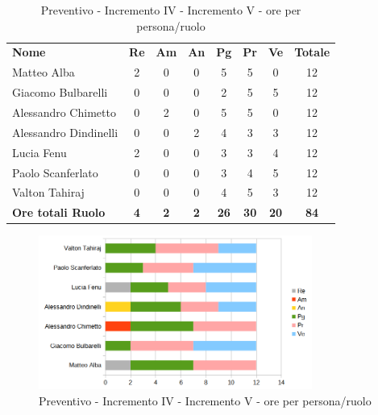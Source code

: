 \begin{table} [h!]
	\begin{center}
		\begin{tabular} { m{3.5cm} c c c c c c c }
			\rowcolor{lightgray}
			\textbf{Nome} & \textbf{Re} & \textbf{Am} & \textbf{An} & \textbf{Pg} & \textbf{Pr} & \textbf{Ve} & \textbf{Totale} \\
			Matteo Alba &2 &0 & 0& 5 &5 & 0 & 12 \\
			Giacomo Bulbarelli & 0 &0 & 0& 2 & 5 & 5 & 12 \\
			Alessandro Chimetto & 0 & 2& 0& 5 & 5 & 0& 12 \\
			Alessandro Dindinelli & 0& 0 & 2& 4 & 3 &3 & 12 \\
			Lucia Fenu & 2 & 0 &0 & 3 & 3 & 4 & 12 \\
			Paolo Scanferlato &0 & 0 &0 & 3 & 4 & 5 & 12\\
			Valton Tahiraj & 0& 0 &0 & 4 & 5 & 3 & 12 \\
			\textbf{Ore totali Ruolo} & \textbf{4} & \textbf{2} & \textbf{2} & \textbf{26} & \textbf{30}& \textbf{20} & \textbf{84}
		\end{tabular}
		\caption{Preventivo - Incremento IV - Incremento V - ore per persona/ruolo}
	\end{center}
\end{table}
\begin{figure} [h!]
	\centering
	\includegraphics[width=0.8\textwidth]{res/img/preventivi/4e5-barre.png}
	\caption{Preventivo - Incremento IV - Incremento V - ore per persona/ruolo} 
\end{figure}

\newpage

